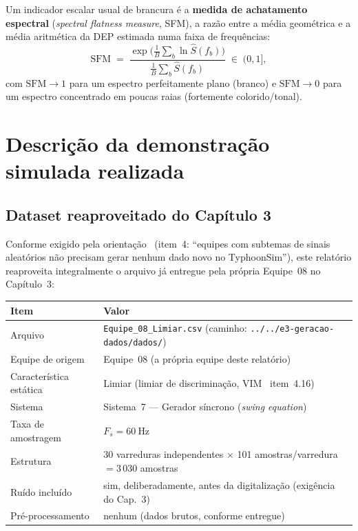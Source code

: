 Um indicador escalar usual de brancura é a \textbf{medida de achatamento espectral}
(\emph{spectral flatness measure}, SFM), a razão entre a média geométrica e a média aritmética da
DEP estimada numa faixa de frequências:
\begin{equation}
\text{SFM} \;=\; \frac{\exp\!\big(\tfrac{1}{B}\sum_b \ln \hat S(f_b)\big)}{\tfrac{1}{B}\sum_b \hat S(f_b)} \;\in\; (0,1],
\label{eq:sfm}
\end{equation}
com $\text{SFM}\to 1$ para um espectro perfeitamente plano (branco) e $\text{SFM}\to 0$ para um
espectro concentrado em poucas raias (fortemente colorido/tonal).

\section{Descrição da demonstração simulada realizada}
\label{sec:metodologia}

\subsection{Dataset reaproveitado do Capítulo 3}
\label{sec:dataset}

Conforme exigido pela orientação~\cite{orientacaocap5} (item~4: ``equipes com subtemas de sinais
aleatórios não precisam gerar nenhum dado novo no TyphoonSim''), este relatório reaproveita
integralmente o arquivo já entregue pela própria Equipe~08 no Capítulo~3:

\begin{center}\small
\begin{tabular}{@{}ll@{}}
\toprule
\textbf{Item} & \textbf{Valor}\\
\midrule
Arquivo & \texttt{Equipe\_08\_Limiar.csv} (caminho: \texttt{../../e3-geracao-dados/dados/})\\
Equipe de origem & Equipe~08 (a própria equipe deste relatório)\\
Característica estática & Limiar (limiar de discriminação, VIM~\cite{vim2012} item~4.16)\\
Sistema & Sistema~7 --- Gerador síncrono (\emph{swing equation})\\
Taxa de amostragem & $F_s = 60\ \text{Hz}$\\
Estrutura & 30 varreduras independentes $\times$ 101 amostras/varredura $=3\,030$ amostras\\
Ruído incluído & sim, deliberadamente, antes da digitalização (exigência do Cap.~3)\\
Pré-processamento & nenhum (dados brutos, conforme entregue)\\
\bottomrule
\end{tabular}
\end{center}

